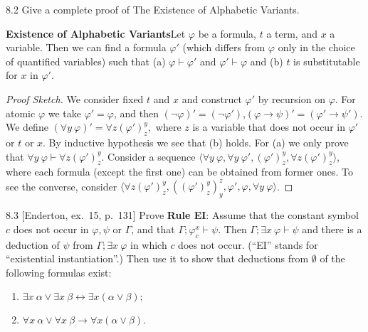 \begin{exercise}{8.2}
  Give a complete proof of The Existence of Alphabetic Variants.
\end{exercise}

\textbf{Existence of Alphabetic Variants}\quad Let $\varphi$ be a formula, $t$ a term, and $x$ a variable. Then we can find a formula $\varphi'$ (which differs from $\varphi$ only in the choice of quantified variables) such that (a) $\varphi\vdash \varphi'$ and $\varphi'\vdash \varphi$ and (b) $t$ is substitutable for $x$ in $\varphi'$.

\begin{proof}[Proof Sketch]
  We consider fixed $t$ and $x$ and construct $\varphi'$ by recursion on $\varphi$. For atomic $\varphi$ we take $\varphi'=\varphi$, and then $(\neg \varphi)'=(\neg \varphi')$,$(\varphi\rightarrow \psi)'=(\varphi'\rightarrow \psi')$. We define $(\forall y\ \varphi)'=\forall z(\varphi')_z^y,$ where $z$ is a variable that does not occur in $\varphi'$ or $t$ or $x$. By inductive hypothesis we see that (b) holds. For (a) we only prove that $\forall y\ \varphi\vdash\forall z(\varphi')_z^y$. Consider a sequence $\langle \forall y\ \varphi, \forall y\ \varphi', (\varphi')_z^y, \forall z(\varphi')_z^y\rangle$, where each formula (except the first one) can be obtained from former ones. To see the converse, consider $\langle\forall z(\varphi')_z^y, ((\varphi')_z^y)_y^z, \varphi',\varphi,\forall y\ \varphi\rangle$.
\end{proof}

\begin{exercise}{8.3}
  [Enderton, ex.~15, p.~131] Prove \textbf{Rule EI}: Assume that the constant symbol $c$ does not occur in $\varphi,\psi$ or $\Gamma$, and that $\Gamma;\varphi_c^x\vdash \psi$. Then $\Gamma;\exists x\ \varphi\vdash \psi$ and there is a deduction of $\psi$ from $\Gamma;\exists x\ \varphi$ in which $c$ does not occur. (``EI'' stands for ``existential instantiation''.) Then use it to show that deductions from $\emptyset$ of the following formulas exist:
  \begin{enumerate}
    \item $\exists x\ \alpha\vee\exists x\ \beta \leftrightarrow \exists x(\alpha\vee \beta);$
    \item $\forall x\ \alpha\vee\forall x\ \beta \rightarrow \forall x(\alpha\vee \beta).$\qedhere
  \end{enumerate}
\end{exercise}

